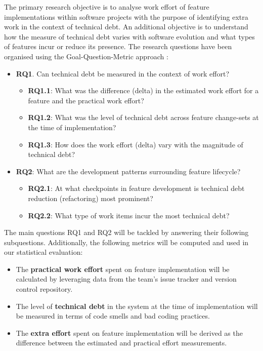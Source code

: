 The primary research objective is to analyse work effort of feature
implementations within software projects with the purpose of identifying extra
work in the context of technical debt. An additional objective is to understand
how the measure of technical debt varies with software evolution and what types
of features incur or reduce its presence. The research questions have been
organised using the Goal-Question-Metric approach \cite{VanSolingen2002}:
\begin{itemize}
	\item \textbf{RQ1}. Can technical debt be measured in the context of work
	      effort?
	      \begin{itemize}
		      \item \textbf{RQ1.1}: What was the difference (delta) in the
		            estimated work effort for a feature and the practical work
		            effort?
		      \item \textbf{RQ1.2}: What was the level of technical debt across
		            feature change-sets at the time of implementation?
		      \item \textbf{RQ1.3}: How does the work effort (delta) vary
		            with the magnitude of technical debt?
	      \end{itemize}
	\item \textbf{RQ2}: What are the development patterns surrounding feature
	      lifecycle?
	      \begin{itemize}
		      \item \textbf{RQ2.1}: At what checkpoints in feature development
		            is technical debt reduction (refactoring) most prominent?
		      \item \textbf{RQ2.2}: What type of work items incur the most
		            technical debt?
	      \end{itemize}
\end{itemize}

The main questions RQ1 and RQ2 will be tackled by answering their following
subquestions. Additionally, the following metrics will be computed and used in
our statistical evaluation: %
\begin{itemize}
	\item The \textbf{practical work effort} spent on feature implementation
	      will be calculated by leveraging data from the team's issue tracker and
	      version control repository.
	\item The level of \textbf{technical debt} in the system at the time of
	      implementation will be measured in terms of code smells and bad coding
	      practices.
	\item The \textbf{extra effort} spent on feature implementation will be
	      derived as the difference between the estimated and practical effort
	      measurements.
\end{itemize}

